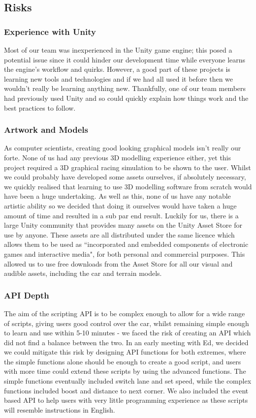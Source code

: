 \subsection{Risks}

\subsubsection{Experience with Unity}
Most of our team was inexperienced in the Unity game engine; this posed a potential issue since it could hinder our development time while everyone learns the engine's workflow and quirks. However, a good part of these projects is learning new tools and technologies and if we had all used it before then we wouldn't really be learning anything new. Thankfully, one of our team members had previously used Unity and so could quickly explain how things work and the best practices to follow.

\subsubsection{Artwork and Models}
As computer scientists, creating good looking graphical models isn't really our forte. None of us had any previous 3D modelling experience either, yet this project required a 3D graphical racing simulation to be shown to the user. Whilst we could probably have developed some assets ourselves, if absolutely necessary, we quickly realised that learning to use 3D modelling software from scratch would have been a huge undertaking. As well as this, none of us have any notable artistic ability so we decided that doing it ourselves would have taken a huge amount of time and resulted in a sub par end result. Luckily for us, there is a large Unity community that provides many assets on the Unity Asset Store for use by anyone. These assets are all distributed under the same licence\cite{unityassetlicence}  which allows them to be used as ``incorporated and embedded components of electronic games and interactive media", for both personal and commercial purposes. This allowed us to use free downloads from the Asset Store for all our visual and audible assets, including the car and terrain models.

\subsubsection{API Depth}
The aim of the scripting API is to be complex enough to allow for a wide range of scripts, giving users good control over the car, whilst remaining simple enough to learn and use within 5-10 minutes - we faced the risk of creating an API which did not find a balance between the two. In an early meeting with Ed, we decided we could mitigate this risk by designing API functions for both extremes, where the simple functions alone should be enough to create a good script, and users with more time could extend these scripts by using the advanced functions. The simple functions eventually included switch lane and set speed, while the complex functions included boost and distance to next corner. We also included the event based API to help users with very little programming experience as these scripts will resemble instructions in English.

